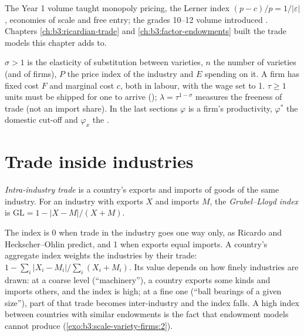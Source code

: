 \begin{recall}
The Year 1 volume taught monopoly pricing, the Lerner index $(p - c)/p = 1/|\varepsilon|$,
economies of scale and free entry; the grades 10--12 volume introduced
. Chapters \ref{ch:b3:ricardian-trade} and
\ref{ch:b3:factor-endowments} built the trade models this chapter adds to.
\end{recall}

\begin{notation}\label{not:b3:scale-variety-firms:symbols}
$\sigma > 1$ is the elasticity of substitution between varieties, $n$ the number
of varieties (and of firms), $P$ the price index of the industry and $E$ spending
on it. A firm has fixed cost $F$ and marginal cost $c$, both in labour, with the
wage set to 1. $\tau \ge 1$ units must be shipped for one to arrive (); $\lambda = \tau^{1-\sigma}$ measures the freeness of trade (not an import
share). In the last sections $\varphi$ is a firm's productivity, $\varphi^*$ the
domestic cut-off and $\varphi_x$ the .
\end{notation}

\section{Trade inside industries}\label{sec:b3:scale-variety-firms:intra}

\begin{definition}\label{def:b3:scale-variety-firms:intra-industry}
\emph{Intra-industry trade} is a country's exports and imports of goods of the
same industry. For an industry with exports $X$ and imports $M$, the
\emph{Grubel--Lloyd index} is $\mathrm{GL} = 1 - |X - M|/(X + M)$.
\end{definition}

\begin{measure}
The index is 0 when trade in the industry goes one way only, as Ricardo and
Heckscher--Ohlin predict, and 1 when exports equal imports. A country's
aggregate index weights the industries by their trade: $1 - \sum_i |X_i - M_i| /
\sum_i (X_i + M_i)$. Its value depends on how finely industries are drawn: at a
coarse level (``machinery''), a country exports some kinds and imports others,
and the index is high; at a fine one (``ball bearings of a given size''),
part of that trade becomes inter-industry and the index falls. A high index
between countries with similar endowments is the fact that endowment models
cannot produce (\cref{exo:b3:scale-variety-firms:2}).
\end{measure}

